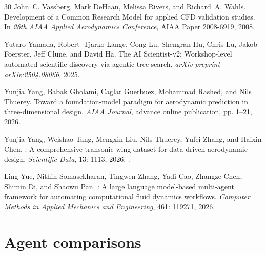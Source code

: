 \documentclass{article} %
\begin{document}
\begin{thebibliography}{30}
John~C. Vassberg, Mark DeHaan, Melissa Rivers, and Richard~A. Wahls.
\newblock Development of a {Common Research Model} for applied {CFD} validation studies.
\newblock In \emph{26th AIAA Applied Aerodynamics Conference}, AIAA Paper 2008-6919, 2008.

Yutaro Yamada, Robert~Tjarko Lange, Cong Lu, Shengran Hu, Chris Lu, Jakob Foerster, Jeff Clune, and David Ha.
\newblock The {AI} {Scientist}-v2: Workshop-level automated scientific discovery via agentic tree search.
\newblock \emph{arXiv preprint arXiv:2504.08066}, 2025.

Yunjia Yang, Babak Gholami, Caglar Guerbuez, Mohammad Rashed, and Nils Thuerey.
\newblock Toward a foundation-model paradigm for aerodynamic prediction in three-dimensional design.
\newblock \emph{AIAA Journal}, advance online publication, pp. 1--21, 2026{}.
\newblock {}.

Yunjia Yang, Weishao Tang, Mengxin Liu, Nils Thuerey, Yufei Zhang, and Haixin Chen.
: A comprehensive transonic wing dataset for data-driven aerodynamic design.
\newblock \emph{Scientific Data}, 13: 1113, 2026{}.
\newblock {}.

Ling Yue, Nithin Somasekharan, Tingwen Zhang, Yadi Cao, Zhangze Chen, Shimin Di, and Shaowu Pan.
: A large language model-based multi-agent framework for automating computational fluid dynamics workflows.
\newblock \emph{Computer Methods in Applied Mechanics and Engineering}, 461: 119271, 2026.

\end{thebibliography}

\clearpage
\appendix
\raggedbottom





\section{Agent comparisons}
\label{app:agent-comparison}
\end{document}
